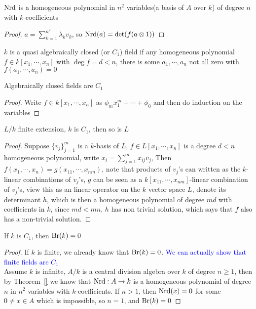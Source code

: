 \documentclass[a4paper,10pt]{article}
\begin{document}
\begin{proposition}
$\operatorname{Nrd}$ is a homogeneous polynomial in $n^2$ variables(a basis of $A$ over $k$) of degree $n$ with $k$-coefficients
\end{proposition}

\begin{proof}
$a=\sum_{k=1}^{n^2}\lambda_kv_k$, so $\operatorname{Nrd}(a)=\det(f(a\otimes1))$
\end{proof}

\begin{definition}
$k$ is a quasi algebraically closed (or $C_1$) field if any homogeneous polynomial $f\in k[x_1,\cdots,x_n]$ with $\deg f=d<n$, there is some $a_1,\cdots,a_n$ not all zero with $f(a_1,\cdots,a_n)=0$
\end{definition}

\begin{proposition}
Algebraically closed fields are $C_1$
\end{proposition}

\begin{proof}
Write $f\in k[x_1,\cdots,x_n]$ as $\phi_m x_1^m+\cdots+\phi_0$ and then do induction on the variables
\end{proof}

\begin{lemma}
$L/k$ finite extension, $k$ is $C_1$, then so is $L$
\end{lemma}

\begin{proof}
Suppose $\{v_j\}_{j=1}^m$ is a $k$-basis of $L$, $f\in L[x_1,\cdots,x_n]$ is a degree $d<n$ homogeneous polynomial, write $x_i=\sum_{j=1}^mx_{ij}v_j$,
Then $f(x_1,\cdots,x_n)=g(x_{11},\cdots,x_{nm})$, note that products of $v_j$'s can written as the $k$-linear combinations of $v_j$'s, $g$ can be seen as a $k[x_{11},\cdots,x_{nm}]$-linear combination of $v_j$'s, view this as an linear operator on the $k$ vector space $L$, denote its determinant $h$, which is then a homogeneous polynomial of degree $md$ with coefficients in $k$, since $md<mn$, $h$ has non trivial solution, which says that $f$ also has a non-trivial solution.
\end{proof}

\begin{proposition}
If $k$ is $C_1$, then $\operatorname{Br}(k)=0$
\end{proposition}

\begin{proof}
If $k$ is finite, we already know that $\operatorname{Br}(k)=0$. \textcolor{blue}{We can actually show that finite fields are $C_1$} \\
Assume $k$ is infinite, $A/k$ is a central division algebra over $k$ of degree $n\geq1$, then by Theorem~\ref{} we know that $\operatorname{Nrd}:A\to k$ is a homogeneous polynomial of degree $n$ in $n^2$ variables with $k$-coefficients. If $n>1$, then $\operatorname{Nrd}(x)=0$ for some $0\neq x\in A$ which is impossible, so $n=1$, and $\operatorname{Br}(k)=0$
\end{proof}
\end{document}
